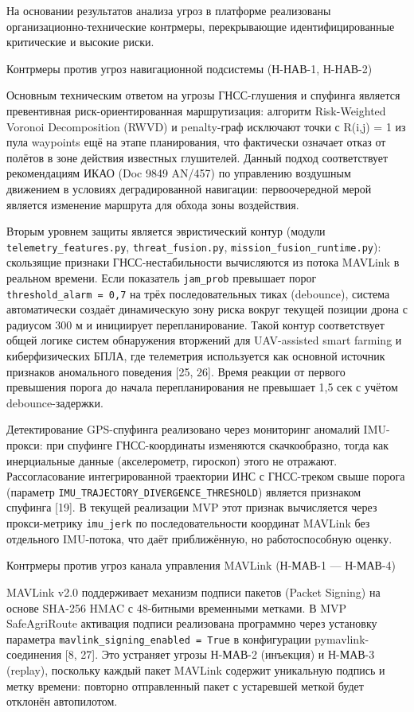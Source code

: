 \documentclass[14pt,a4paper]{extarticle}
\begin{document}
На основании результатов анализа угроз в платформе реализованы организационно-технические контрмеры, перекрывающие идентифицированные критические и высокие риски.

Контрмеры против угроз навигационной подсистемы (Н-НАВ-1, Н-НАВ-2)

Основным техническим ответом на угрозы ГНСС-глушения и спуфинга является превентивная риск-ориентированная маршрутизация: алгоритм Risk-Weighted Voronoi Decomposition (RWVD) и penalty-граф исключают точки с R(i,j) = 1 из пула waypoints ещё на этапе планирования, что фактически означает отказ от полётов в зоне действия известных глушителей. Данный подход соответствует рекомендациям ИКАО (Doc 9849 AN/457) по управлению воздушным движением в условиях деградированной навигации: первоочередной мерой является изменение маршрута для обхода зоны воздействия.

Вторым уровнем защиты является эвристический контур (модули \texttt{telemetry\_features.py}, \texttt{threat\_fusion.py}, \texttt{mission\_fusion\_runtime.py}): скользящие признаки ГНСС-нестабильности вычисляются из потока MAVLink в реальном времени. Если показатель \texttt{jam\_prob} превышает порог \texttt{threshold\_alarm\ =\ 0,7} на трёх последовательных тиках (debounce), система автоматически создаёт динамическую зону риска вокруг текущей позиции дрона с радиусом 300 м и инициирует перепланирование. Такой контур соответствует общей логике систем обнаружения вторжений для UAV-assisted smart farming и киберфизических БПЛА, где телеметрия используется как основной источник признаков аномального поведения {[}25, 26{]}. Время реакции от первого превышения порога до начала перепланирования не превышает 1,5 сек с учётом debounce-задержки.

Детектирование GPS-спуфинга реализовано через мониторинг аномалий IMU-прокси: при спуфинге ГНСС-координаты изменяются скачкообразно, тогда как инерциальные данные (акселерометр, гироскоп) этого не отражают. Рассогласование интегрированной траектории ИНС с ГНСС-треком свыше порога (параметр \texttt{IMU\_TRAJECTORY\_DIVERGENCE\_THRESHOLD}) является признаком спуфинга {[}19{]}. В текущей реализации MVP этот признак вычисляется через прокси-метрику \texttt{imu\_jerk} по последовательности координат MAVLink без отдельного IMU-потока, что даёт приближённую, но работоспособную оценку.

Контрмеры против угроз канала управления MAVLink (Н-МАВ-1 --- Н-МАВ-4)

MAVLink v2.0 поддерживает механизм подписи пакетов (Packet Signing) на основе SHA-256 HMAC с 48-битными временными метками. В MVP SafeAgriRoute активация подписи реализована программно через установку параметра \texttt{mavlink\_signing\_enabled\ =\ True} в конфигурации pymavlink-соединения {[}8, 27{]}. Это устраняет угрозы Н-МАВ-2 (инъекция) и Н-МАВ-3 (replay), поскольку каждый пакет MAVLink содержит уникальную подпись и метку времени: повторно отправленный пакет с устаревшей меткой будет отклонён автопилотом.
\end{document}
